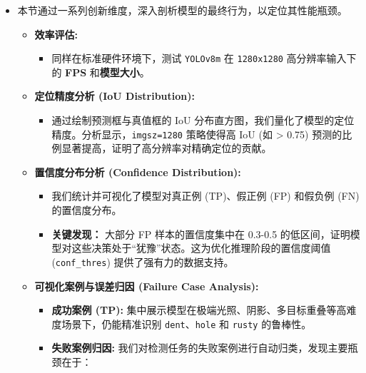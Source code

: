 \documentclass[
]{article}
\begin{document}
\begin{itemize}
\item
  本节通过一系列创新维度，深入剖析模型的最终行为，以定位其性能瓶颈。

  \begin{itemize}
  \item
    \textbf{效率评估:}

    \begin{itemize}
    \item
      同样在标准硬件环境下，测试 \texttt{YOLOv8m} 在 \texttt{1280x1280}
      高分辨率输入下的 \textbf{FPS} 和\textbf{模型大小}。
    \end{itemize}
  \item
    \textbf{定位精度分析 (IoU Distribution):}

    \begin{itemize}
    \item
      通过绘制预测框与真值框的 IoU
      分布直方图，我们量化了模型的定位精度。分析显示，\texttt{imgsz=1280}
      策略使得高 IoU (如 \textgreater{} 0.75)
      预测的比例显著提高，证明了高分辨率对精确定位的贡献。
    \end{itemize}
  \item
    \textbf{置信度分布分析 (Confidence Distribution):}

    \begin{itemize}
    \item
      我们统计并可视化了模型对真正例 (TP)、假正例 (FP) 和假负例 (FN)
      的置信度分布。
    \item
      \textbf{关键发现：} 大部分 FP 样本的置信度集中在 0.3-0.5
      的低区间，证明模型对这些决策处于``犹豫''状态。这为优化推理阶段的置信度阈值
      (\texttt{conf\_thres}) 提供了强有力的数据支持。
    \end{itemize}
  \item
    \textbf{可视化案例与误差归因 (Failure Case Analysis):}

    \begin{itemize}
    \item
      \textbf{成功案例 (TP):}
      集中展示模型在极端光照、阴影、多目标重叠等高难度场景下，仍能精准识别
      \texttt{dent}、\texttt{hole} 和 \texttt{rusty} 的鲁棒性。
    \item
      \textbf{失败案例归因:}
      我们对检测任务的失败案例进行自动归类，发现主要瓶颈在于：


\end{itemize}
\end{itemize}
\end{itemize}
\end{document}
